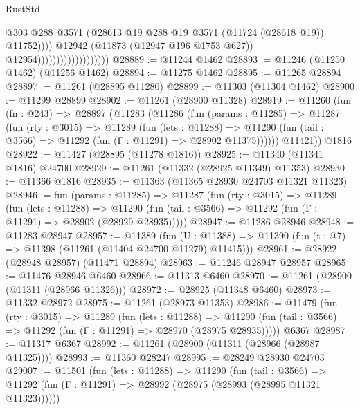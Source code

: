 \begin{lexlean}{RustStd}
\begin{coremodule}
                                                @303
                                                @288
                                                @3571
                                                (@28613
                                                  @19
                                                  @288
                                                  @19
                                                  @3571
                                                  (@11724 (@28618 @19))
                                                  @11752))))
                                          @12942
                                          (@11873 (@12947 @196 @1753 @627))
                                          @12954)))))))))))))))))))
@28889 := @11244 @1462
@28893 := @11246 (@11250 @1462) (@11256 @1462)
@28894 := @11275 @1462
@28895 := @11265 @28894
@28897 := @11261 (@28895 @11280)
@28899 := @11303 (@11304 @1462)
@28900 := @11299 @28899
@28902 := @11261 (@28900 @11328)
@28919 := @11260
    (fun (fn : @243) =>
    @28897
      (@11283
        (@11286
          (fun (params : @11285) =>
          @11287
            (fun (rty : @3015) =>
            @11289
              (fun (lets : @11288) =>
              @11290 (fun (tail : @3566) => @11292 (fun (Γ : @11291) => @28902 @11375))))))
        @11421))
    @1816
@28922 := @11427 (@28895 (@11278 @1816))
@28925 := @11340 (@11341 @1816) @24700
@28929 := @11261 (@11332 (@28925 @11349) @11353)
@28930 := @11366 @1816
@28935 := @11363 (@11365 @28930 @24703 @11321 @11323)
@28946 := fun (params : @11285) =>
  @11287
    (fun (rty : @3015) =>
    @11289
      (fun (lets : @11288) =>
      @11290 (fun (tail : @3566) => @11292 (fun (Γ : @11291) => @28902 (@28929 @28935)))))
@28947 := @11286 @28946
@28948 := @11283 @28947
@28957 := @11389
    (fun (U : @11388) => @11390 (fun (t : @7) => @11398 (@11261 (@11404 @24700 @11279) @11415)))
@28961 := @28922 (@28948 @28957) (@11471 @28894)
@28963 := @11246 @28947 @28957
@28965 := @11476 @28946 @6460
@28966 := @11313 @6460
@28970 := @11261 (@28900 (@11311 (@28966 @11326)))
@28972 := @28925 (@11348 @6460)
@28973 := @11332 @28972
@28975 := @11261 (@28973 @11353)
@28986 := @11479
    (fun (rty : @3015) =>
    @11289
      (fun (lets : @11288) =>
      @11290 (fun (tail : @3566) => @11292 (fun (Γ : @11291) => @28970 (@28975 @28935)))))
    @6367
@28987 := @11317 @6367
@28992 := @11261 (@28900 (@11311 (@28966 (@28987 @11325))))
@28993 := @11360 @28247
@28995 := @28249 @28930 @24703
@29007 := @11501
    (fun (lets : @11288) =>
    @11290
      (fun (tail : @3566) =>
      @11292 (fun (Γ : @11291) => @28992 (@28975 (@28993 (@28995 @11321 @11323))))))

\end{coremodule}
\end{lexlean}
